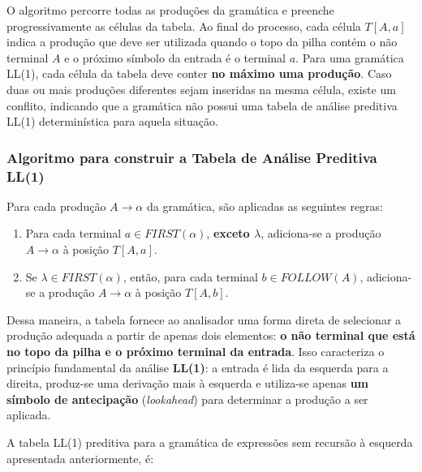 \documentclass[
  brazilian,
  letterpaper,
]{book}
\theoremstyle{plain}
\theoremstyle{definition}
\theoremstyle{remark}
\begin{document}
O algoritmo percorre todas as produções da gramática e preenche
progressivamente as células da tabela. Ao final do processo, cada célula
\(T[A,a]\) indica a produção que deve ser utilizada quando o topo da
pilha contém o não terminal \(A\) e o próximo símbolo da entrada é o
terminal \(a\). Para uma gramática LL(1), cada célula da tabela deve
conter \textbf{no máximo uma produção}. Caso duas ou mais produções
diferentes sejam inseridas na mesma célula, existe um conflito,
indicando que a gramática não possui uma tabela de análise preditiva
LL(1) determinística para aquela situação.

\subsubsection{Algoritmo para construir a Tabela de Análise Preditiva
LL(1)}\label{algoritmo-para-construir-a-tabela-de-anuxe1lise-preditiva-ll1}

Para cada produção \(A\rightarrow\alpha\) da gramática, são aplicadas as
seguintes regras:

\begin{enumerate}
\def\labelenumi{\arabic{enumi}.}
\item
  Para cada terminal \(a\in FIRST(\alpha)\), \textbf{exceto
  \(\lambda\)}, adiciona-se a produção \(A\rightarrow\alpha\) à posição
  \(T[A,a]\).
\item
  Se \(\lambda\in FIRST(\alpha)\), então, para cada terminal
  \(b\in FOLLOW(A)\), adiciona-se a produção \(A\rightarrow\alpha\) à
  posição \(T[A,b]\).
\end{enumerate}

Dessa maneira, a tabela fornece ao analisador uma forma direta de
selecionar a produção adequada a partir de apenas dois elementos:
\textbf{o não terminal que está no topo da pilha e o próximo terminal da
entrada}. Isso caracteriza o princípio fundamental da análise
\textbf{LL(1)}: a entrada é lida da esquerda para a direita, produz-se
uma derivação mais à esquerda e utiliza-se apenas \textbf{um símbolo de
antecipação} (\emph{lookahead}) para determinar a produção a ser
aplicada.

A tabela LL(1) preditiva para a gramática de expressões sem recursão à
esquerda apresentada anteriormente, é:
\end{document}

